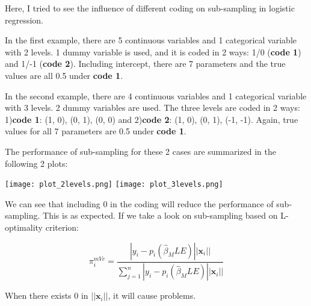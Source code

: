 \documentclass[]{article}
\begin{document}
Here, I tried to see the influence of different coding on sub-sampling in logistic regression. 

In the first example, there are 5 continuous variables and 1 categorical variable with 2 levels. 1 dummy variable is used, and it is coded in 2 ways: 1/0 (\textbf{code 1}) and 1/-1 (\textbf{code 2}). Including intercept, there are 7 parameters and the true values are all 0.5 under \textbf{code 1}.

In the second example,  there are 4 continuous variables and 1 categorical variable with 3 levels. 2 dummy variables are used. The three levels are coded in 2 ways: 1)\textbf{code 1}: (1, 0), (0, 1), (0, 0) and 2)\textbf{code 2}: (1, 0), (0, 1), (-1, -1). Again, true values for all 7 parameters are 0.5 under \textbf{code 1}.

The performance of sub-sampling for these 2 cases are summarized in the following 2 plots:

\texttt{[image: plot\_2levels.png]}
\texttt{[image: plot\_3levels.png]}

We can see that including 0 in the coding will reduce the performance of sub-sampling. This is as expected. If we take a look on sub-sampling based on L-optimality criterion:

\begin{equation*}
	\pi_{i}^{mVc} = \frac{|y_i-p_i(\hat{\beta}_MLE)||\boldsymbol{x}_i||}{\sum_{j=1}^{n}|y_i-p_i(\hat{\beta}_MLE)||\boldsymbol{x}_i||}
\end{equation*}

When there exists 0 in $||\boldsymbol{x}_i||$, it will cause problems.




	
	
	
\end{document}
